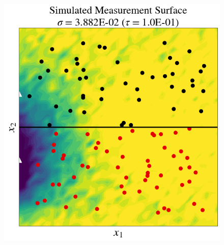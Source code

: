 \begin{frame}
\begin{figure}
\centering
    \includegraphics[width=0.5\linewidth]{figures/pde-highd/pde-highd_sensors_D2.png}
\label{fig:pde-Q}
\end{figure}
\end{frame}



